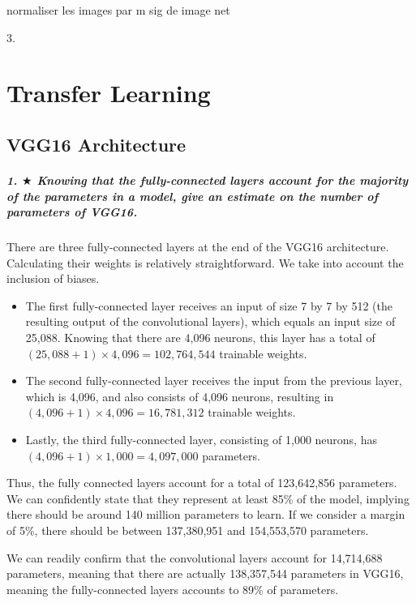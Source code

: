 normaliser les images par m sig de image net 

3. 





\chapter{Transfer Learning}
\section{VGG16 Architecture}
\paragraph{1. $\bigstar$ Knowing that the fully-connected layers account for the majority of the parameters in a model, give an estimate on the number of parameters of VGG16.}

There are three fully-connected layers at the end of the VGG16 architecture. Calculating their weights is relatively straightforward. We take into account the inclusion of biases.

\begin{itemize}
    \item The first fully-connected layer receives an input of size 7 by 7 by 512 (the resulting output of the convolutional layers), which equals an input size of 25,088. Knowing that there are 4,096 neurons, this layer has a total of $(25,088 + 1) \times 4,096 = 102,764,544$ trainable weights.
    \item The second fully-connected layer receives the input from the previous layer, which is 4,096, and also consists of 4,096 neurons, resulting in $(4,096 + 1) \times 4,096 = 16,781,312$ trainable weights.
    \item Lastly, the third fully-connected layer, consisting of 1,000 neurons, has $(4,096 + 1) \times 1,000 = 4,097,000$ parameters.
\end{itemize}

Thus, the fully connected layers account for a total of 123,642,856 parameters. We can confidently state that they represent at least 85\% of the model, implying there should be around 140 million parameters to learn. If we consider a margin of 5\%, there should be between 137,380,951 and 154,553,570 parameters.

We can readily confirm that the convolutional layers account for 14,714,688 parameters, meaning that there are actually 138,357,544 parameters in VGG16, meaning the fully-connected layers accounts to 89\% of parameters.

